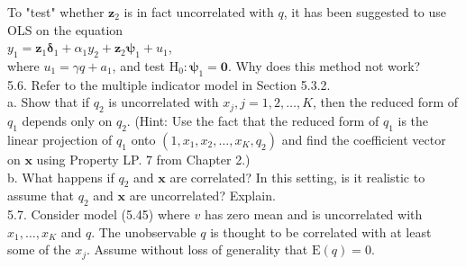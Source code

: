\documentclass[10pt]{article}
\begin{document}
To "test" whether $\mathbf{z}_{2}$ is in fact uncorrelated with $q$, it has been suggested to use OLS on the equation\\
$y_{1}=\mathbf{z}_{1} \boldsymbol{\delta}_{1}+\alpha_{1} y_{2}+\mathbf{z}_{2} \boldsymbol{\psi}_{1}+u_{1}$,\\
where $u_{1}=\gamma q+a_{1}$, and test $\mathrm{H}_{0}: \boldsymbol{\psi}_{1}=\mathbf{0}$. Why does this method not work?\\
5.6. Refer to the multiple indicator model in Section 5.3.2.\\
a. Show that if $q_{2}$ is uncorrelated with $x_{j}, j=1,2, \ldots, K$, then the reduced form of $q_{1}$ depends only on $q_{2}$. (Hint: Use the fact that the reduced form of $q_{1}$ is the linear projection of $q_{1}$ onto $\left(1, x_{1}, x_{2}, \ldots, x_{K}, q_{2}\right)$ and find the coefficient vector on $\mathbf{x}$ using Property LP. 7 from Chapter 2.)\\
b. What happens if $q_{2}$ and $\mathbf{x}$ are correlated? In this setting, is it realistic to assume that $q_{2}$ and $\mathbf{x}$ are uncorrelated? Explain.\\
5.7. Consider model (5.45) where $v$ has zero mean and is uncorrelated with $x_{1}, \ldots, x_{K}$ and $q$. The unobservable $q$ is thought to be correlated with at least some of the $x_{j}$. Assume without loss of generality that $\mathrm{E}(q)=0$.
\end{document}

